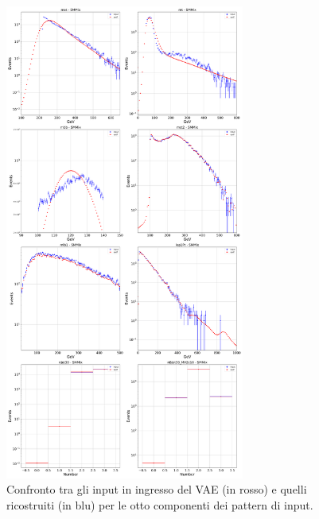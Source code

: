 \begin{figure}[h!]
	\centering
	\includegraphics[width=0.70\textwidth]{figs/risultati_simulazione/ricostruzione.png}
	\caption{Confronto tra gli input in ingresso del VAE (in rosso) e quelli ricostruiti (in blu) per le otto componenti dei pattern di input.}
	\label{ricostruzione}
\end{figure}

\newpage

